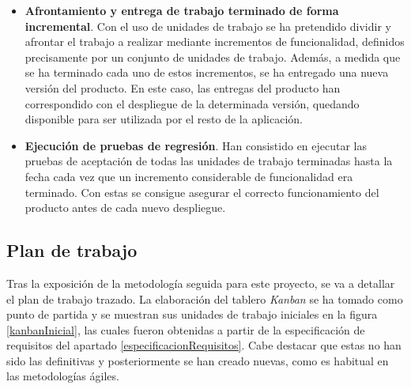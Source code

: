 \documentclass[11pt,spanish,listoffigures]{tfgetsinf}
\begin{document}
\begin{itemize}
	\item \textbf{Afrontamiento y entrega de trabajo terminado de forma incremental}. Con el uso de unidades de trabajo se ha pretendido dividir y afrontar el trabajo a realizar mediante incrementos de funcionalidad, definidos precisamente por un conjunto de unidades de trabajo. Además, a medida que se ha terminado cada uno de estos incrementos, se ha entregado una nueva versión del producto. En este caso, las entregas del producto han correspondido con el despliegue de la determinada versión, quedando disponible para ser utilizada por el resto de la aplicación.

	\item \textbf{Ejecución de pruebas de regresión}. Han consistido en ejecutar las pruebas de aceptación de todas las unidades de trabajo terminadas hasta la fecha cada vez que un incremento considerable de funcionalidad era terminado. Con estas se consigue asegurar el correcto funcionamiento del producto antes de cada nuevo despliegue.

\end{itemize}


		\subsection{Plan de trabajo} \label{planDeTrabajo}

Tras la exposición de la metodología seguida para este proyecto, se va a detallar el plan de trabajo trazado. La elaboración del tablero \emph{Kanban} se ha tomado como punto de partida y se muestran sus unidades de trabajo iniciales en la figura \ref{kanbanInicial}, las cuales fueron obtenidas a partir de la especificación de requisitos del apartado \ref{especificacionRequisitos}. Cabe destacar que estas no han sido las definitivas y posteriormente se han creado nuevas, como es habitual en las metodologías ágiles.
\end{document}
